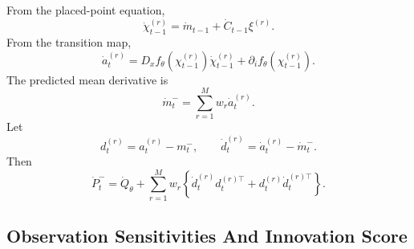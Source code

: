 From the placed-point equation,
\begin{equation}
  \dot\chi_{t-1}^{(r)}=
  \dot m_{t-1}+\dot C_{t-1}\xi^{(r)}.
  \label{eq:bf-hd-sgqf-dot-pred-place}
\end{equation}
From the transition map,
\begin{equation}
  \dot a_t^{(r)}=
  D_xf_\theta(\chi_{t-1}^{(r)})\dot\chi_{t-1}^{(r)}
  +\partial_i f_\theta(\chi_{t-1}^{(r)}).
  \label{eq:bf-hd-sgqf-dot-transition}
\end{equation}
The predicted mean derivative is
\begin{equation}
  \dot m_t^-=
  \sum_{r=1}^M w_r\dot a_t^{(r)}.
  \label{eq:bf-hd-sgqf-dot-pred-mean}
\end{equation}
Let
\begin{equation}
  d_t^{(r)}=a_t^{(r)}-m_t^-,
  \qquad
  \dot d_t^{(r)}=\dot a_t^{(r)}-\dot m_t^-.
  \label{eq:bf-hd-sgqf-pred-centered}
\end{equation}
Then
\begin{equation}
  \dot P_t^-=
  \dot Q_\theta
  +
  \sum_{r=1}^M w_r
  \left\{\dot d_t^{(r)}d_t^{(r)\top}+d_t^{(r)}\dot d_t^{(r)\top}\right\}.
  \label{eq:bf-hd-sgqf-dot-pred-cov}
\end{equation}

\subsection{Observation Sensitivities And Innovation Score}
\label{sec:bf-hd-sgqf-observation-sensitivities}

